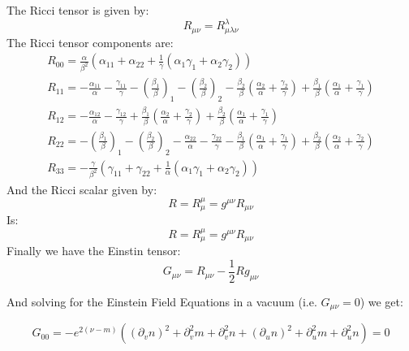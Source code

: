 \documentclass{article}
\begin{document}
The Ricci tensor is given by:
\begin{equation}
R_{\mu\nu}=R_{\mu\lambda\nu}^{\lambda}
\end{equation}
The Ricci tensor components are:
\begin{equation}
\begin{array}{l}
R_{00}=\frac{\alpha}{\beta^{2}}\left(\alpha_{11}+\alpha_{22}+\frac{1}{\gamma}\left(\alpha_{1}\gamma_{1}+\alpha_{2}\gamma_{2}\right)\right)\\
R_{11}=-\frac{\alpha_{11}}{\alpha}-\frac{\gamma_{11}}{\gamma}-\left(\frac{\beta_{1}}{\beta}\right)_{1}-\left(\frac{\beta_{2}}{\beta}\right)_{2}-\frac{\beta_{2}}{\beta}\left(\frac{\alpha_{2}}{\alpha}+\frac{\gamma_{2}}{\gamma}\right)+\frac{\beta_{1}}{\beta}\left(\frac{\alpha_{1}}{\alpha}+\frac{\gamma_{1}}{\gamma}\right)\\
R_{12}=-\frac{\alpha_{12}}{\alpha}-\frac{\gamma_{12}}{\gamma}+\frac{\beta_{1}}{\beta}\left(\frac{\alpha_{2}}{\alpha}+\frac{\gamma_{2}}{\gamma}\right)+\frac{\beta_{2}}{\beta}\left(\frac{\alpha_{1}}{\alpha}+\frac{\gamma_{1}}{\gamma}\right)\\
R_{22}=-\left(\frac{\beta_{1}}{\beta}\right)_{1}-\left(\frac{\beta_{2}}{\beta}\right)_{2}-\frac{\alpha_{22}}{\alpha}-\frac{\gamma_{22}}{\gamma}-\frac{\beta_{1}}{\beta}\left(\frac{\alpha_{1}}{\alpha}+\frac{\gamma_{1}}{\gamma}\right)+\frac{\beta_{2}}{\beta}\left(\frac{\alpha_{2}}{\alpha}+\frac{\gamma_{2}}{\gamma}\right)\\
R_{33}=-\frac{\gamma}{\beta^{2}}\left(\gamma_{11}+\gamma_{22}+\frac{1}{\alpha}\left(\alpha_{1}\gamma_{1}+\alpha_{2}\gamma_{2}\right)\right)
\end{array}
\end{equation}
And the Ricci scalar given by:
\begin{equation}
R=R_{\mu}^{\mu}=g^{\mu\nu}R_{\mu\nu}
\end{equation}
Is:
\begin{equation}
R=R_{\mu}^{\mu}=g^{\mu\nu}R_{\mu\nu}
\end{equation}
Finally we have the Einstin tensor:
\begin{equation}
G_{\mu\nu}=R_{\mu\nu}-\frac{1}{2}Rg_{\mu\nu}
\end{equation}

And solving for the Einstein Field Equations in a vacuum (i.e. $G_{\mu\nu}=0$)
we get:

\begin{equation}
G_{00}=-e^{2(\nu-m)}\left(\left(\partial_{v}n\right)^{2}+\partial_{v}^{2}m+\partial_{v}^{2}n+\left(\partial_{u}n\right)^{2}+\partial_{u}^{2}m+\partial_{u}^{2}n\right)=0\label{eq:G00}
\end{equation}
\end{document}
